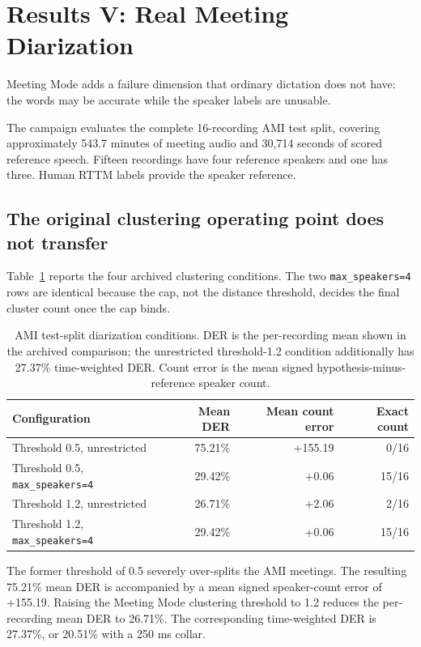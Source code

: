 \section{Results V: Real Meeting Diarization}

Meeting Mode adds a failure dimension that ordinary dictation does not have: the words may be
accurate while the speaker labels are unusable.

The campaign evaluates the complete 16-recording AMI test split, covering approximately 543.7
minutes of meeting audio and 30,714 seconds of scored reference speech. Fifteen recordings have
four reference speakers and one has three. Human RTTM labels provide the speaker reference.

\subsection{The original clustering operating point does not transfer}

Table~\ref{tab:ami} reports the four archived clustering conditions. The two
\texttt{max\_speakers=4} rows are identical because the cap, not the distance threshold,
decides the final cluster count once the cap binds.

\begin{table}[ht]
\centering
\caption{AMI test-split diarization conditions. DER is the per-recording mean shown in the
archived comparison; the unrestricted threshold-1.2 condition additionally has 27.37\%
time-weighted DER. Count error is the mean signed hypothesis-minus-reference speaker count.}
\label{tab:ami}
\begin{tabular}{lrrr}
\toprule
Configuration & Mean DER & Mean count error & Exact count \\
\midrule
Threshold 0.5, unrestricted & 75.21\% & +155.19 & 0/16 \\
Threshold 0.5, \texttt{max\_speakers=4} & 29.42\% & +0.06 & 15/16 \\
Threshold 1.2, unrestricted & 26.71\% & +2.06 & 2/16 \\
Threshold 1.2, \texttt{max\_speakers=4} & 29.42\% & +0.06 & 15/16 \\
\bottomrule
\end{tabular}
\end{table}

The former threshold of 0.5 severely over-splits the AMI meetings. The resulting
75.21\% mean DER is accompanied by a mean signed speaker-count error of +155.19. Raising the Meeting Mode clustering threshold to 1.2 reduces the
per-recording mean DER to 26.71\%. The corresponding time-weighted DER is 27.37\%, or 20.51\%
with a 250 ms collar.

